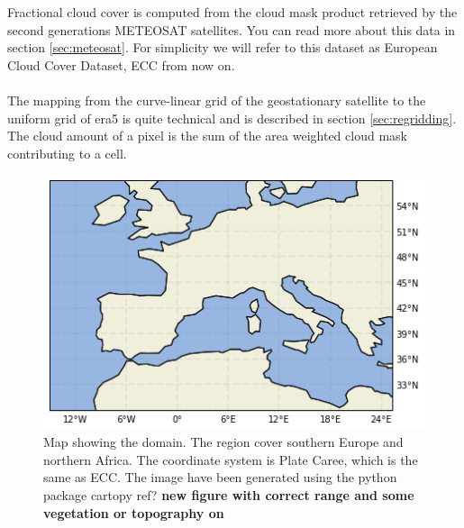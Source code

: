 Fractional cloud cover is computed from the cloud mask product retrieved by the second generations METEOSAT satellites. You can read more about this data in section \ref{sec:meteosat}. For simplicity we will refer to this dataset as European Cloud Cover Dataset, ECC from now on. 
\\ \\ 
The mapping from the curve-linear grid of the geostationary satellite to the uniform grid of era5 is quite technical and is described in section \ref{sec:regridding}. The cloud amount of a pixel is the sum of the area weighted cloud mask contributing to a cell.


\begin{figure}[h]
    \centering
    \includegraphics[scale = 0.7]{Chapter2_Theory/images/Domain.png}
    \caption{Map showing the domain. The region cover southern Europe and northern Africa. The coordinate system is Plate Caree, which is the same as ECC. The image have been generated using the python package cartopy ref? \textbf{new figure with correct range and some vegetation or topography on  }}
    \label{fig:map}
\end{figure}

